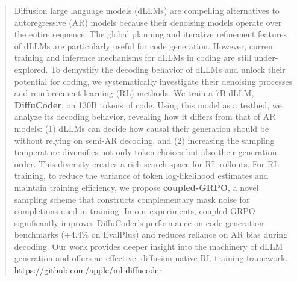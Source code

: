 \begin{abstract}
Diffusion large language models (dLLMs) are compelling alternatives to autoregressive (AR) models because their denoising models operate over the entire sequence. The global planning and iterative refinement features of dLLMs are particularly useful for code generation.
However, current training and inference mechanisms for dLLMs in coding are still under-explored.
To demystify the decoding behavior of dLLMs and unlock their potential for coding, we systematically investigate their denoising processes and reinforcement learning (RL) methods. 
We train a 7B dLLM, \textbf{DiffuCoder}, on 130B tokens of code.
Using this model as a testbed, we analyze its decoding behavior, revealing how it differs from that of AR models: (1) dLLMs can decide how causal their generation should be without relying on semi-AR decoding, and (2) increasing the sampling temperature diversifies not only token choices but also their generation order. This diversity creates a rich search space for RL rollouts.
For RL training, to reduce the variance of token log-likelihood estimates and maintain training efficiency, we propose \textbf{coupled-GRPO}, a novel sampling scheme that constructs complementary mask noise for completions used in training. 
In our experiments, coupled-GRPO significantly improves DiffuCoder's performance on code generation benchmarks (+4.4\% on EvalPlus) and reduces reliance on AR bias during decoding.
Our work provides deeper insight into the machinery of dLLM generation and offers an effective, diffusion-native RL training framework. \url{https://github.com/apple/ml-diffucoder}
\end{abstract}